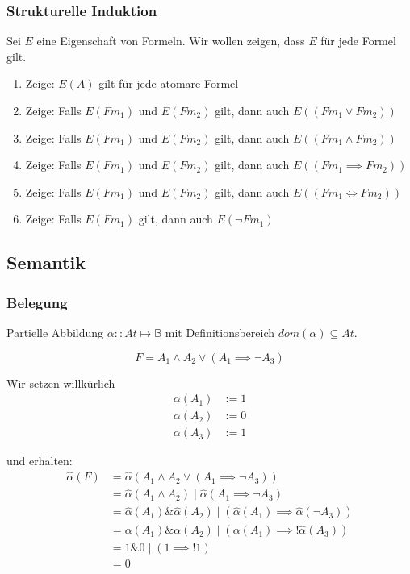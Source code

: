 \documentclass{scrartcl}
\begin{document}
\subsubsection{Strukturelle Induktion}

Sei $E$ eine Eigenschaft von Formeln. Wir wollen zeigen, dass $E$ für jede Formel gilt.

\begin{enumerate}
	\item Zeige: $E(A)$ gilt für jede atomare Formel
	\item Zeige: Falls $E(Fm_1)$ und $E(Fm_2)$ gilt, dann auch $E((Fm_1 \vee Fm_2))$
	\item Zeige: Falls $E(Fm_1)$ und $E(Fm_2)$ gilt, dann auch $E((Fm_1 \wedge Fm_2))$
	\item Zeige: Falls $E(Fm_1)$ und $E(Fm_2)$ gilt, dann auch $E((Fm_1 \implies Fm_2))$
	\item Zeige: Falls $E(Fm_1)$ und $E(Fm_2)$ gilt, dann auch $E((Fm_1 \iff Fm_2))$
	\item Zeige: Falls $E(Fm_1)$ gilt, dann auch $E(\neg Fm_1)$
\end{enumerate}

\subsection{Semantik}

\subsubsection{Belegung}

Partielle Abbildung $\alpha :: At \mapsto \mathbb{B}$ mit Definitionsbereich $dom(\alpha) \subseteq At$.

\begin{equation}
	F = A_1 \wedge A_2 \vee (A_1 \implies \neg A_3)
\end{equation}

Wir setzen willkürlich
\begin{equation}
	\begin{split}
		\alpha(A_1) &:= 1 \\
		\alpha(A_2) &:= 0 \\
		\alpha(A_3) &:= 1
	\end{split}
\end{equation}

und erhalten:
\begin{equation}
	\begin{split}
		\widehat{\alpha}(F) &= \widehat{\alpha}(A_1 \wedge A_2 \vee (A_1 \implies \neg A_3)) \\
		&= \widehat{\alpha}(A_1 \wedge A_2) \mid \widehat{\alpha}(A_1 \implies \neg A_3) \\
		&= \widehat{\alpha}(A_1) \& \widehat{\alpha}(A_2) \mid (\widehat{\alpha}(A_1) \implies \widehat{\alpha}(\neg A_3)) \\
		&= \alpha(A_1) \& \alpha(A_2) \mid (\alpha(A_1) \implies !\widehat{\alpha}(A_3)) \\
		&= 1 \& 0 \mid (1 \implies !1) \\
		&= 0
	\end{split}
\end{equation}
\end{document}
